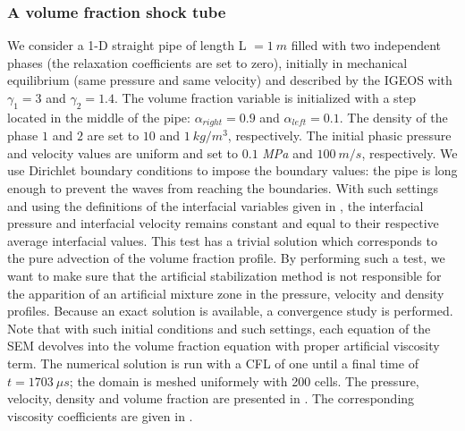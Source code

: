 \documentclass[preprint,10pt]{elsarticle}
\begin{document}
\subsubsection{A volume fraction shock tube}\label{sec:vf-advection-test}
%
We consider a 1-D straight pipe of length L $=1 \ m$ filled with two independent phases (the relaxation coefficients are set to zero), initially in mechanical 
equilibrium (same pressure and same velocity) and described by the IGEOS with $\gamma_1 = 3$ and $\gamma_2 = 1.4$. The volume 
fraction variable is initialized with a step located in the middle of the pipe: $\alpha_{right}=0.9$ and $\alpha_{left}=0.1$. The density of the phase $1$ and $2$ are set to $10$ and $1 \ kg/
m^3$, respectively.  
The initial phasic pressure and velocity values are uniform and set to $0.1$ {\it MPa} and $100 \ m/s$, respectively. We use Dirichlet boundary 
conditions to impose the boundary values: the pipe is long enough to prevent the waves from reaching the boundaries. With such settings and using the definitions of 
the interfacial variables given in , the interfacial pressure and 
interfacial velocity remains constant and equal to their respective average interfacial values. This test has a trivial solution which corresponds to 
the pure advection of the volume fraction 
profile. By performing such a test, we want to make sure that the artificial stabilization method is not responsible for the apparition of an artificial 
mixture zone in the pressure, velocity and density profiles. Because an exact solution is available, a convergence study is performed. 
Note that with such initial conditions and such settings, each equation of the SEM devolves into the volume fraction equation with proper artificial viscosity term. The 
numerical solution is run with a CFL of one until a final time of $t=1703 \ \mu s$; the domain is meshed uniformely with 200 cells. The pressure, velocity, density and volume 
fraction are presented in . The corresponding viscosity coefficients are given in .
%
\end{document}
